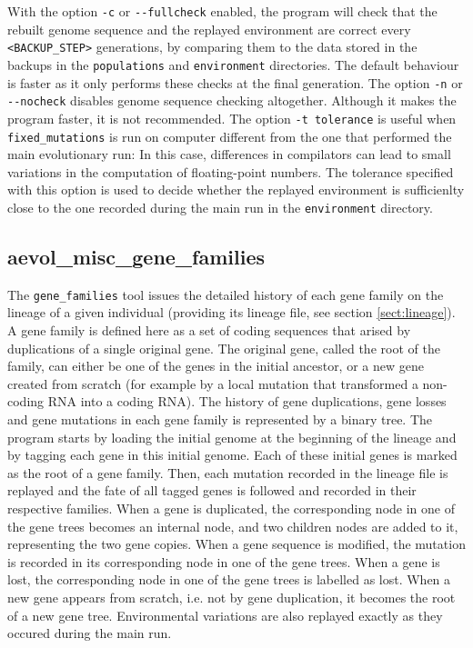 With the option \verb?-c? or \verb?--fullcheck? enabled, the program will check that the rebuilt genome sequence and the replayed environment are correct every \verb?<BACKUP_STEP>? generations, by comparing them to the data stored in the backups in the \verb?populations? and \verb?environment? directories. The default behaviour is faster as it only performs these checks at the final generation. The option \verb?-n? or \verb?--nocheck? disables genome sequence checking altogether. Although it makes the program faster, it is not recommended. The option \verb?-t tolerance? is useful when \verb?fixed_mutations? is run on computer different from the one that performed the main evolutionary run: In this case, differences in compilators can lead to small variations in the computation of floating-point numbers. The tolerance specified with this option is used to decide whether the replayed environment is sufficienlty close to the one recorded during the main run in the \verb?environment? directory.



\subsection{aevol\_misc\_gene\_families}
\label{sect:ancstats}
The \verb?gene_families? tool issues the detailed history of each gene family on the lineage of a given individual (providing its lineage file, see section \ref{sect:lineage}). A gene family is defined here as a set of coding sequences that arised by duplications of a single original gene. The original gene, called the root of the family, can either be one of the genes in the initial ancestor, or a new gene created from scratch (for example by a local mutation that transformed a non-coding RNA into a coding RNA). The history of gene duplications, gene losses and gene mutations in each gene family is represented by a binary tree. The program starts by loading the initial genome at the beginning of the lineage and by tagging each gene in this initial genome. Each of these initial genes is marked as the root of a gene family. Then, each mutation recorded in the lineage file is replayed and the fate of all tagged genes is followed and recorded in their respective families. When a gene is duplicated, the corresponding node in one of the gene trees becomes an internal node, and two children nodes are added to it, representing the two gene copies. When a gene sequence is modified, the mutation is recorded in its corresponding node in one of the gene trees. When a gene is lost, the corresponding node in one of the gene trees is labelled as lost. When a new gene appears from scratch, i.e. not by gene duplication, it becomes the root of a new gene tree. Environmental variations are also replayed exactly as they occured during the main run.

